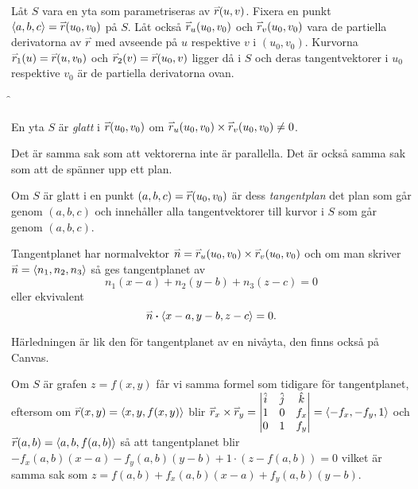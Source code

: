\documentclass[a4paper]{article}
\begin{document}
    Låt \(
        S
    \) vara en yta som parametriseras av \(
        \accentset{\rightharpoonup}{r}(u,v)
    \). Fixera en punkt \(
        \left\langle a, b, c\right\rangle = \accentset{\rightharpoonup}{r}(u_0, v_0)
    \) på \(
        S
    \). Låt också \(
        \accentset{\rightharpoonup}{r}_u(u_0, v_0)
    \) och \(
        \accentset{\rightharpoonup}{r}_v(u_0,v_0)
    \) vara de partiella derivatorna av \(
        \accentset{\rightharpoonup}{r}
    \) med avseende på \(
        u
    \) respektive \(
        v
    \) i \(
        (u_0,v_0)
    \). Kurvorna \(
        \accentset{\rightharpoonup}{r}_1(u) = \accentset{\rightharpoonup}{r}(u,v_0) 
    \) och \(
        \accentset{\rightharpoonup}{r}_2(v) = \accentset{\rightharpoonup}{r}(u_0, v)
    \) ligger då i \(
        S
    \) och deras tangentvektorer i \(
        u_0
    \) respektive \(
        v_0
    \) är de partiella derivatorna ovan. 

    \f

\begin{defn}
    En yta \(
        S
    \) är \emph{glatt} i \(
        \accentset{\rightharpoonup}{r}(u_0, v_0)
    \) om \(
        \accentset{\rightharpoonup}{r}_u(u_0,v_0) \times \accentset{\rightharpoonup}{r}_v(u_0,v_0) \neq 0
    \).

    Det är samma sak som att vektorerna inte är parallella. Det är också samma sak 
    som att de spänner upp ett plan.
\end{defn}
\begin{defn}
    Om \(
        S
    \) är glatt i en punkt \(
        (a,b,c) = \accentset{\rightharpoonup}{r}(u_0,v_0)
    \) är dess \emph{tangentplan} det plan som går genom \(
        (a,b,c)
    \) och innehåller alla tangentvektorer till kurvor i \(
        S
    \) som går genom \(
        (a,b,c)
    \).

    Tangentplanet har normalvektor \(
        \accentset{\rightharpoonup}{n} = \accentset{\rightharpoonup}{r}_u(u_0,v_0) \times \accentset{\rightharpoonup}{r}_v(u_0,v_0)
    \) och om man skriver \(
        \accentset{\rightharpoonup}{n} = \left\langle n_1, n_2, n_3\right\rangle
    \) så ges tangentplanet av \[
        n_1(x-a) + n_2(y-b) + n_3(z-c) = 0
    \] eller ekvivalent \[
        \accentset{\rightharpoonup}{n} \boldsymbol{\cdot} \left\langle x-a, y-b, z-c\right\rangle = 0.
    \]

    Härledningen är lik den för tangentplanet av en nivåyta, den finns också
    på Canvas.
\end{defn}

Om \(
    S
\) är grafen \(
    z = f(x,y)
\) får vi samma formel som tidigare för tangentplanet, eftersom om \(
    \accentset{\rightharpoonup}{r}(x,y) = \left\langle x,y,f(x,y)\right\rangle 
\) blir \(
    \accentset{\rightharpoonup}{r}_x \times \accentset{\rightharpoonup}{r}_y = 
    \begin{vmatrix}
        \hat{i} & \hat{j} & \hat{k} \\ 
        1 & 0 & f_x \\ 
        0 & 1 & f_y
    \end{vmatrix} = \left\langle -f_x, -f_y, 1 \right\rangle
\) och \(
    \accentset{\rightharpoonup}{r}(a,b) = \left\langle a, b, f(a,b)\right\rangle
\) så att tangentplanet blir \(
    -f_x(a,b) (x-a) - f_y(a,b)(y-b) + 1 \cdot (z - f(a,b)) = 0
\) vilket är samma sak som \(
    z = f(a,b) + f_x(a,b)(x-a)+f_y(a,b)(y-b)
\).
\end{document}
